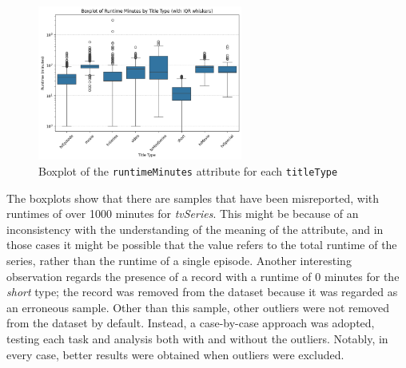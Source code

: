 \begin{figure}[H]
    \centering
        \includegraphics[width=0.6\textwidth]{plots/outliers.png}
        \caption{Boxplot of the \texttt{runtimeMinutes} attribute for each \texttt{titleType}}
        \label{fig:runtimeMinutes_boxplot}
    \captionsetup{justification=centering}
    \label{fig:outliers}
\end{figure}

The boxplots show that there are samples that have been misreported, with runtimes of over 1000 minutes for \textit{tvSeries}.
This might be because of an inconsistency with the understanding of the meaning of the attribute, and in those cases it might be possible that
the value refers to the total runtime of the series, rather than the runtime of a single episode.
Another interesting observation regards the presence of a record with a runtime of 0 minutes for the \textit{short} type;
the record was removed from the dataset because it was regarded as an erroneous sample.
Other than this sample, other outliers were not removed from the dataset by default. Instead, a case-by-case approach was adopted,
testing each task and analysis both with and without the outliers. Notably, in every case, better results were obtained when outliers were excluded.